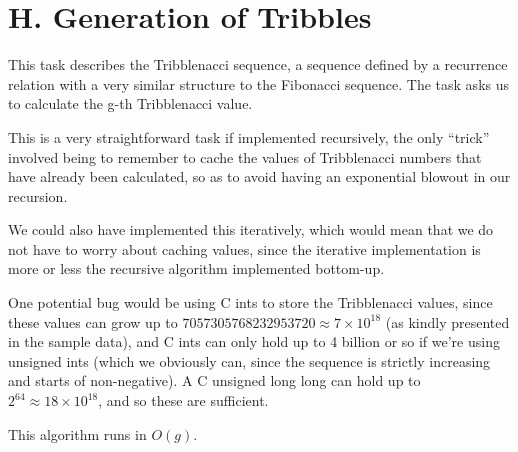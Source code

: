 \section*{H. Generation of Tribbles}

This task describes the Tribblenacci sequence, a sequence defined by a
recurrence relation with a very similar structure to the Fibonacci sequence.
The task asks us to calculate the g-th Tribblenacci value.

This is a very straightforward task if implemented recursively, the only
``trick'' involved being to remember to cache the values of Tribblenacci
numbers that have already been calculated, so as to avoid having an exponential
blowout in our recursion.

We could also have implemented this iteratively, which would mean that we do
not have to worry about caching values, since the iterative implementation is
more or less the recursive algorithm implemented bottom-up.

One potential bug would be using C ints to store the Tribblenacci values, since
these values can grow up to $7057305768232953720 \approx 7 \times 10^{18}$ (as
kindly presented in the sample data), and C ints can only hold up to 4 billion
or so if we're using unsigned ints (which we obviously can, since the sequence
is strictly increasing and starts of non-negative). A C unsigned long long can
hold up to $2^{64} \approx 18 \times 10^{18}$, and so these are sufficient.

This algorithm runs in $O(g)$.
